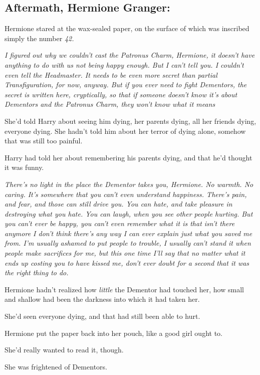 \subsection{Aftermath, Hermione Granger:}

Hermione stared at the wax-sealed paper, on the surface of which was inscribed
simply the number \emph{42.}

\emph{I figured out why we couldn't cast the Patronus Charm, Hermione, it
doesn't have anything to do with us not being happy enough. But I can't tell
you. I couldn't even tell the Headmaster. It needs to be even more secret than
partial Transfiguration, for now, anyway. But if you ever need to fight
Dementors, the secret is written here, cryptically, so that if someone doesn't
know it's about Dementors and the Patronus Charm, they won't know what it
means{\el}}

She'd told Harry about seeing him dying, her parents dying, all her friends
dying, everyone dying. She hadn't told him about her terror of dying alone,
somehow that was still too painful.

Harry had told her about remembering his parents dying, and that he'd thought
it was funny.

\emph{There's no light in the place the Dementor takes you, Hermione. No
warmth. No caring. It's somewhere that you can't even understand happiness.
There's pain, and fear, and those can still drive you. You can hate, and take
pleasure in destroying what you hate. You can laugh, when you see other people
hurting. But you can't ever be happy, you can't even remember what it is that
isn't there anymore{\el} I don't think there's any way I can ever explain
just what you saved me from. I'm usually ashamed to put people to trouble, I
usually can't stand it when people make sacrifices for me, but this one time
I'll say that no matter what it ends up costing you to have kissed me, don't
ever doubt for a second that it was the right thing to do.}

Hermione hadn't realized how \emph{little} the Dementor had touched her, how
small and shallow had been the darkness into which it had taken her.

She'd seen everyone dying, and that had still been able to hurt.

Hermione put the paper back into her pouch, like a good girl ought to.

She'd really wanted to read it, though.

She was frightened of Dementors.
\sbreak
\vspace{-2\baselineskip}
